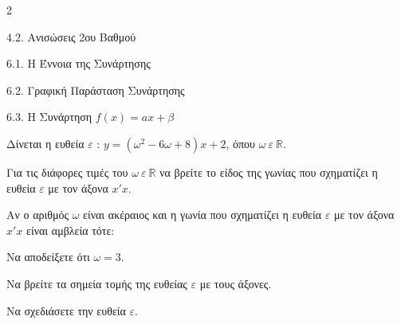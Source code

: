 \begin{ylh}{2}
    \item 4.2. Ανισώσεις 2ου Βαθμού
    \item 6.1. Η Έννοια της Συνάρτησης
    \item 6.2. Γραφική Παράσταση Συνάρτησης
    \item 6.3. Η Συνάρτηση $f(x)=ax+\beta$
\end{ylh}
Δίνεται η ευθεία $\varepsilon$ : $y = \left( \omega^{2} - 6\omega + 8 \right)x + 2$, όπου $\omega\ \varepsilon\ \mathbb{R}$.
\begin{alist}
\item Για τις διάφορες τιμές του $\omega\ \varepsilon\ \mathbb{R}$ να βρείτε το είδος της γωνίας που σχηματίζει η ευθεία $\varepsilon$ με τον άξονα $x'x$.
\item Αν ο αριθμός $\omega$ είναι ακέραιος και η γωνία που σχηματίζει η ευθεία $\varepsilon$ με τον άξονα $x'x$ είναι αμβλεία τότε:
\begin{rlist}
\item
  Να αποδείξετε ότι $\omega = 3$.
\item
 Να βρείτε τα σημεία τομής της ευθείας $\varepsilon$ με τους άξονες.

\item
 Να σχεδιάσετε την ευθεία $\varepsilon$.
\end{rlist}
\end{alist}

